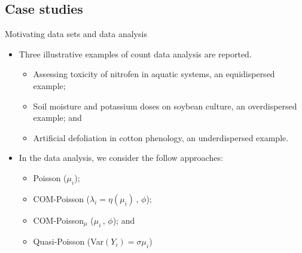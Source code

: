 \documentclass[11pt]{beamer}\usepackage[]{graphicx}\usepackage[]{color}
\begin{document}
\subsection{Case studies}

\begin{frame}[t]{Motivating data sets and data analysis}

  \begin{itemize}
    \item Three illustrative examples of count data analysis are
      reported.
      \begin{itemize} \normalsize
      \item Assessing toxicity of nitrofen in aquatic systems, an
        equidispersed example;
      \item Soil moisture and potassium doses on soybean culture, an
        overdispersed example; and
      \item Artificial defoliation in cotton phenology, an
        underdispersed example.
      \end{itemize}
      \vspace{0.3cm}
    \item In the data analysis, we consider the follow approaches:
      \begin{itemize}
      \item Poisson ($\mu_{i}$);
      \item COM-Poisson ($\lambda_{i}=\eta(\mu_{i})\,,\,\phi$);
      \item COM-Poisson$_\mu$ ($\mu_{i}\,,\,\phi$); and
      \item Quasi-Poisson (Var$(Y_{i})=\sigma\mu_{i}$)
      \end{itemize}
    \end{itemize}
\end{frame}
\end{document}
